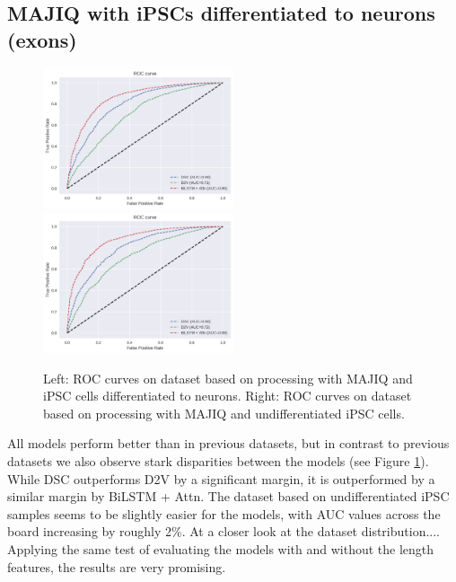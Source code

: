 

\subsection{MAJIQ with iPSCs differentiated to neurons (exons)} \label{sec:hipsci_neuron_majiq}

\begin{figure}
	\centering\includegraphics[width=0.5\textwidth]{../visualizations/ch5-results/majiq_neuron_cross_model_roc_auc_comparison.png} 
	\centering\includegraphics[width=0.5\textwidth]{../visualizations/ch5-results/majiq_ipsc_cross_model_roc_auc_comparison.png} 
	\caption{Left: ROC curves on dataset based on processing with MAJIQ and iPSC cells differentiated to neurons. Right: ROC curves on dataset based on processing with MAJIQ and undifferentiated iPSC cells. }
	\label{fig:majiq_rocs}
\end{figure}

All models perform better than in previous datasets, but in contrast to previous datasets we also observe stark disparities between the models (see Figure \ref{fig:majiq_rocs}). While DSC outperforms D2V by a significant margin, it is outperformed by a similar margin by BiLSTM + Attn. The dataset based on undifferentiated iPSC samples seems to be slightly easier for the models, with AUC values across the board increasing by roughly 2\%. At a closer look at the dataset distribution....
Applying the same test of evaluating the models with and without the length features, the results are very promising. 

